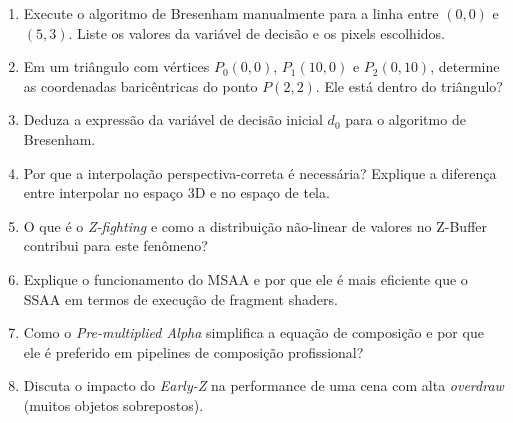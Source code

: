 \begin{enumerate}
    \item Execute o algoritmo de Bresenham manualmente para a linha entre $(0, 0)$ e $(5, 3)$. Liste os valores da variável de decisão e os pixels escolhidos.
    \item Em um triângulo com vértices $P_0(0,0)$, $P_1(10,0)$ e $P_2(0,10)$, determine as coordenadas baricêntricas do ponto $P(2, 2)$. Ele está dentro do triângulo?
    \item Deduza a expressão da variável de decisão inicial $d_0$ para o algoritmo de Bresenham.
    \item Por que a interpolação perspectiva-correta é necessária? Explique a diferença entre interpolar no espaço 3D e no espaço de tela.
    \item O que é o \textit{Z-fighting} e como a distribuição não-linear de valores no Z-Buffer contribui para este fenômeno?
    \item Explique o funcionamento do MSAA e por que ele é mais eficiente que o SSAA em termos de execução de fragment shaders.
    \item Como o \textit{Pre-multiplied Alpha} simplifica a equação de composição e por que ele é preferido em pipelines de composição profissional?
    \item Discuta o impacto do \textit{Early-Z} na performance de uma cena com alta \textit{overdraw} (muitos objetos sobrepostos).
\end{enumerate}
